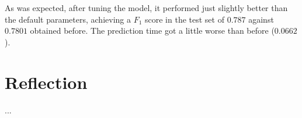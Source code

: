 \documentclass[a4paper]{article}
\begin{document}
As was expected, after tuning the model, it performed just slightly better than the default parameters, achieving a $F_1$ score in the test set of $0.787$ against $0.7801$ obtained before. The prediction time got a little worse than before ($0.0662$).


\section{Reflection}
...





\end{document}
